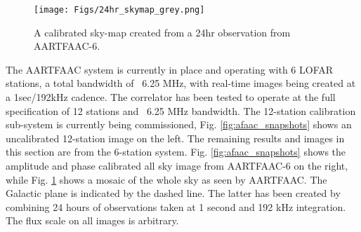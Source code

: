 \documentclass{ws-jai}
\begin{document}
\begin{figure}
  \texttt{[image: Figs/24hr\_skymap\_grey.png]}
  \caption{A calibrated sky-map created from a 24hr observation from AARTFAAC-6.}
  \label{fig:afaac_24hr}
  
\end{figure}
The AARTFAAC system is currently in place and operating with 6 LOFAR stations, a
total  bandwidth  of  ~6.25  MHz,  with real-time  images  being  created  at  a
1sec/192kHz  cadence. The  correlator has  been tested  to operate  at the  full
specification of 12 stations and ~6.25 MHz bandwidth. The 12-station calibration
sub-system is currently being commissioned, Fig. \ref{fig:afaac_snapshots} shows
an uncalibrated 12-station image on the  left.  The remaining results and images
in this section are from  the 6-station system.  Fig.  \ref{fig:afaac_snapshots}
shows the  amplitude and phase calibrated  all sky image from  AARTFAAC-6 on the
right, while Fig.  \ref{fig:afaac_24hr} shows a  mosaic of the whole sky as seen
by AARTFAAC. The Galactic plane is indicated  by the dashed line. The latter has
been created by combining 24 hours of observations taken at 1 second and 192 kHz
integration.  The flux scale on all images is arbitrary. \\
\end{document}
